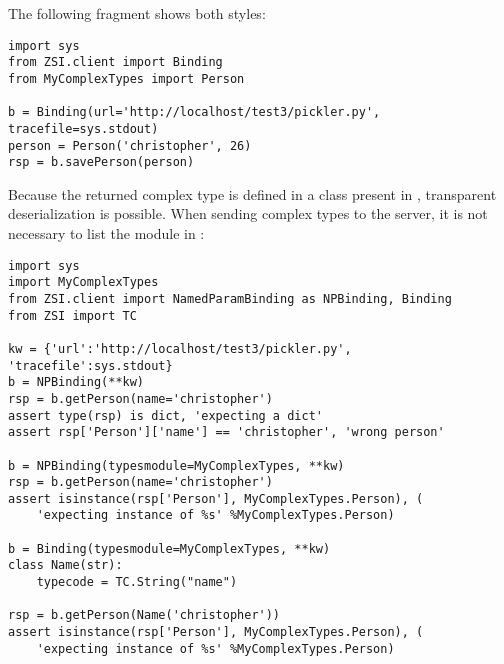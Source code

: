 The following fragment shows both styles:

\begin{verbatim}
import sys
from ZSI.client import Binding
from MyComplexTypes import Person

b = Binding(url='http://localhost/test3/pickler.py', tracefile=sys.stdout)
person = Person('christopher', 26)
rsp = b.savePerson(person)

\end{verbatim}

Because the returned complex type is defined in a class present in
, transparent deserialization is possible.  When sending
complex types to the server, it is not necessary to list the module
in :

\begin{verbatim}
import sys
import MyComplexTypes
from ZSI.client import NamedParamBinding as NPBinding, Binding
from ZSI import TC

kw = {'url':'http://localhost/test3/pickler.py', 'tracefile':sys.stdout}
b = NPBinding(**kw)
rsp = b.getPerson(name='christopher')
assert type(rsp) is dict, 'expecting a dict'
assert rsp['Person']['name'] == 'christopher', 'wrong person'

b = NPBinding(typesmodule=MyComplexTypes, **kw)
rsp = b.getPerson(name='christopher')
assert isinstance(rsp['Person'], MyComplexTypes.Person), (
    'expecting instance of %s' %MyComplexTypes.Person)

b = Binding(typesmodule=MyComplexTypes, **kw)
class Name(str):
    typecode = TC.String("name")

rsp = b.getPerson(Name('christopher'))
assert isinstance(rsp['Person'], MyComplexTypes.Person), (
    'expecting instance of %s' %MyComplexTypes.Person)

\end{verbatim}



